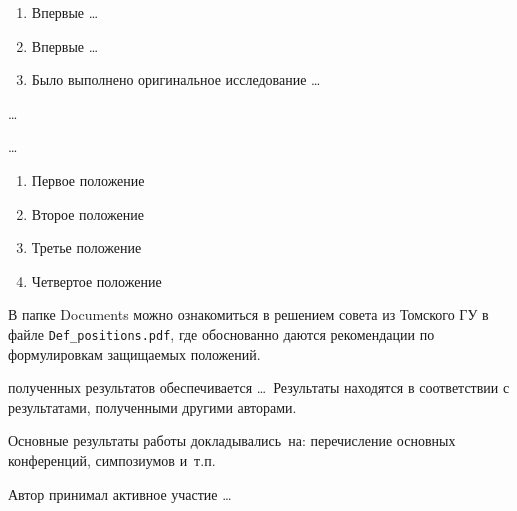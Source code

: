 {\novelty}
\begin{enumerate}
  \item Впервые \ldots
  \item Впервые \ldots
  \item Было выполнено оригинальное исследование \ldots
\end{enumerate}

{\influence} \ldots

{\methods} \ldots

{}
\begin{enumerate}
  \item Первое положение
  \item Второе положение
  \item Третье положение
  \item Четвертое положение
\end{enumerate}
В папке Documents можно ознакомиться в решением совета из Томского ГУ
в файле \verb+Def_positions.pdf+, где обоснованно даются рекомендации
по формулировкам защищаемых положений. 

{\reliability} полученных результатов обеспечивается \ldots \ Результаты находятся в соответствии с результатами, полученными другими авторами.


{\probation}
Основные результаты работы докладывались~на:
перечисление основных конференций, симпозиумов и~т.\:п.

{\contribution} Автор принимал активное участие \ldots


